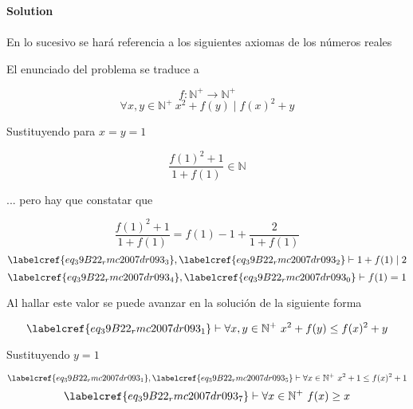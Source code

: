 \noindent\textbf{Solution } \\\\

En lo sucesivo se hará referencia a los siguientes axiomas de los números reales



El enunciado del problema se traduce a

\begin{equation} \label{eq_39B22_rmc2007dr093_0}
	f: \mathbb{N}^+ \to \mathbb{N}^+
\end{equation}
\begin{equation} \label{eq_39B22_rmc2007dr093_1}
	\forall x,y \in \mathbb{N}^+\ x^2 + f(y) \mid f(x)^2 + y
\end{equation}

Sustituyendo para $x = y = 1$ 

\begin{equation} \label{eq_39B22_rmc2007dr093_2}
	\frac{f(1)^2 + 1}{1+f(1)} \in \mathbb{N}
\end{equation}

... pero hay que constatar que

\begin{equation} \label{eq_39B22_rmc2007dr093_3}
	\frac{f(1)^2 + 1}{1+f(1)} = f(1) - 1 + \frac{2}{1+f(1)}
\end{equation}
\begin{equation} \label{eq_39B22_rmc2007dr093_4}
	\labelcref{eq_39B22_rmc2007dr093_3}, \labelcref{eq_39B22_rmc2007dr093_2} \vdash 1+f(1) \mid 2
\end{equation}
\begin{equation} \label{eq_39B22_rmc2007dr093_5}
	\labelcref{eq_39B22_rmc2007dr093_4}, \labelcref{eq_39B22_rmc2007dr093_0} \vdash f(1) = 1
\end{equation}

Al hallar este valor se puede avanzar en la solución de la siguiente forma

\begin{equation} \label{eq_39B22_rmc2007dr093_6}
	\labelcref{eq_39B22_rmc2007dr093_1} \vdash \forall x,y \in \mathbb{N}^+\ x^2 + f(y) \leq f(x)^2 + y
\end{equation}

Sustituyendo $y=1$

\begin{equation} \label{eq_39B22_rmc2007dr093_7}
	\labelcref{eq_39B22_rmc2007dr093_1}, \labelcref{eq_39B22_rmc2007dr093_5} \vdash \forall x \in \mathbb{N}^+\ x^2 + 1 \leq f(x)^2 + 1
\end{equation}
\begin{equation} \label{eq_39B22_rmc2007dr093_8}
	\labelcref{eq_39B22_rmc2007dr093_7} \vdash \forall x \in \mathbb{N}^+\ f(x) \geq x
\end{equation}

